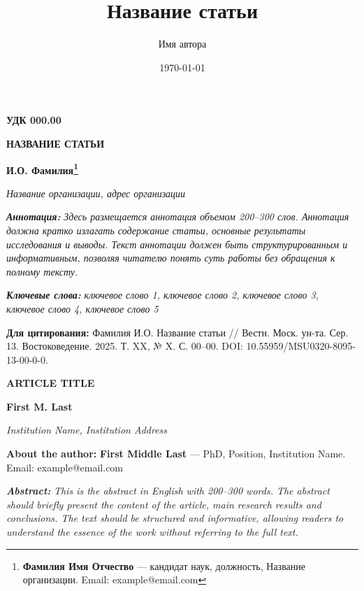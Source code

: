 \documentclass[12pt]{article}    %
\title{Название статьи}
\author{Имя автора}
\date{\today}
\newcommand{\udc}[1]{%
    \noindent\textbf{УДК #1}%
    \par\vspace{0.5em}%
}
\newcommand{\articletitleru}[1]{%
    \begin{center}
        \fontsize{14}{16}\selectfont\bfseries\MakeUppercase{#1}
    \end{center}
    \vspace{0.3em}
}
\newcommand{\authorru}[1]{%
    \begin{center}
        \fontsize{14}{16}\selectfont\bfseries #1
    \end{center}
    \vspace{0.3em}
}
\newcommand{\institution}[1]{%
    \begin{center}
        \fontsize{12}{14}\selectfont\itshape #1
    \end{center}
    \vspace{0.5em}
}
\newcommand{\abstractru}[1]{%
    \noindent\textbf{\textit{Аннотация:}} \textit{#1}%
    \par\vspace{0.5em}%
}
\newcommand{\keywordsru}[1]{%
    \noindent\textbf{\textit{Ключевые слова:}} \textit{#1}%
    \par\vspace{0.5em}%
}
\newcommand{\funding}[1]{%
    \noindent\textbf{Финансирование:} #1%
    \par\vspace{0.5em}%
}
\newcommand{\citation}[1]{%
    \noindent\textbf{Для цитирования:} #1%
    \par\vspace{1em}%
}
\newcommand{\articletitleen}[1]{%
    \begin{center}
        \fontsize{14}{16}\selectfont\bfseries\MakeUppercase{#1}
    \end{center}
    \vspace{0.3em}
}
\newcommand{\authoren}[1]{%
    \begin{center}
        \fontsize{14}{16}\selectfont\bfseries #1
    \end{center}
    \vspace{0.3em}
}
\newcommand{\institutionen}[1]{%
    \begin{center}
        \fontsize{12}{14}\selectfont\itshape #1
    \end{center}
    \vspace{0.5em}
}
\newcommand{\aboutauthor}[1]{%
    \noindent\textbf{About the author:} #1%
    \par\vspace{0.5em}%
}
\newcommand{\abstracten}[1]{%
    \noindent\textbf{\textit{Abstract:}} \textit{#1}%
    \par\vspace{0.5em}%
}
\begin{document}

\udc{000.00}

\articletitleru{Название статьи}

\authorru{И.О. Фамилия\footnote{%
    \textbf{Фамилия Имя Отчество} — кандидат наук, должность, Название организации. Email: example@email.com%
}}

\institution{Название организации, адрес организации}

\abstractru{Здесь размещается аннотация объемом 200--300 слов. Аннотация должна кратко излагать содержание статьи, основные результаты исследования и выводы. Текст аннотации должен быть структурированным и информативным, позволяя читателю понять суть работы без обращения к полному тексту.}

\keywordsru{ключевое слово 1, ключевое слово 2, ключевое слово 3, ключевое слово 4, ключевое слово 5}


\citation{Фамилия И.О. Название статьи // Вестн. Моск. ун-та. Сер. 13. Востоковедение. 2025. Т. XX, № X. С. 00--00. DOI: 10.55959/MSU0320-8095-13-00-0-0.}

\vspace{1em}


\articletitleen{Article Title}

\authoren{First M. Last}

\institutionen{Institution Name, Institution Address}

\aboutauthor{\textbf{First Middle Last} — PhD, Position, Institution Name. Email: example@email.com}

\abstracten{This is the abstract in English with 200--300 words. The abstract should briefly present the content of the article, main research results and conclusions. The text should be structured and informative, allowing readers to understand the essence of the work without referring to the full text.}
\end{document}
